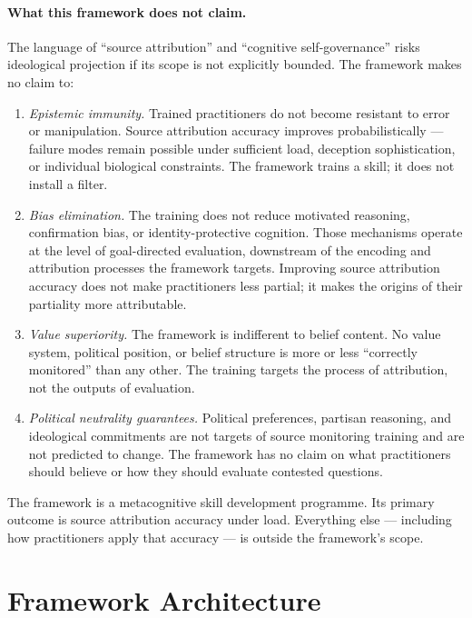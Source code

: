 \documentclass[12pt, a4paper]{article}
\begin{document}
\paragraph{What this framework does not claim.}
The language of ``source attribution'' and ``cognitive self-governance'' risks
ideological projection if its scope is not explicitly bounded. The framework
makes no claim to:
\begin{enumerate}[leftmargin=2em]
\item \emph{Epistemic immunity.} Trained practitioners do not become resistant
to error or manipulation. Source attribution accuracy improves probabilistically
--- failure modes remain possible under sufficient load, deception sophistication,
or individual biological constraints. The framework trains a skill; it does not
install a filter.
\item \emph{Bias elimination.} The training does not reduce motivated reasoning,
confirmation bias, or identity-protective cognition. Those mechanisms operate at
the level of goal-directed evaluation, downstream of the encoding and attribution
processes the framework targets. Improving source attribution accuracy does not
make practitioners less partial; it makes the origins of their partiality more
attributable.
\item \emph{Value superiority.} The framework is indifferent to belief content.
No value system, political position, or belief structure is more or less
``correctly monitored'' than any other. The training targets the process of
attribution, not the outputs of evaluation.
\item \emph{Political neutrality guarantees.} Political preferences, partisan
reasoning, and ideological commitments are not targets of source monitoring
training and are not predicted to change. The framework has no claim on what
practitioners should believe or how they should evaluate contested questions.
\end{enumerate}
The framework is a metacognitive skill development programme. Its primary outcome
is source attribution accuracy under load. Everything else --- including how
practitioners apply that accuracy --- is outside the framework's scope.

\section{Framework Architecture}
\end{document}
